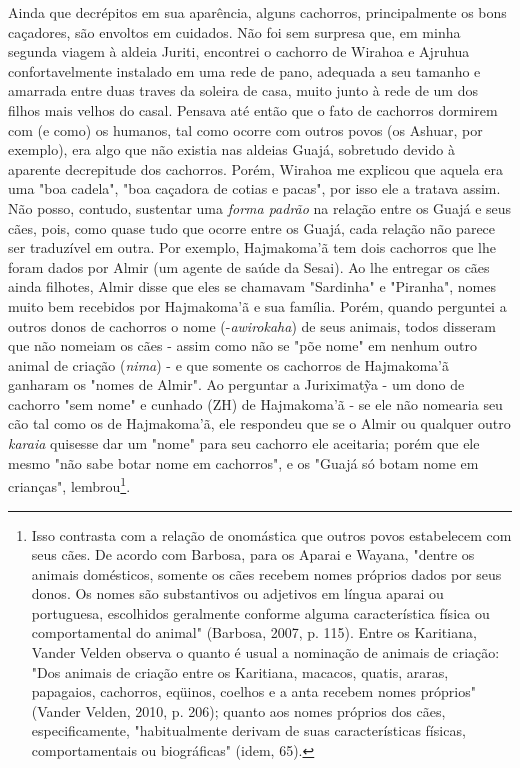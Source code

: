 Ainda que decrépitos em sua aparência, alguns cachorros, principalmente
os bons caçadores, são envoltos em cuidados. Não foi sem surpresa que,
em minha segunda viagem à aldeia Juriti, encontrei o cachorro de Wirahoa
e Ajruhua confortavelmente instalado em uma rede de pano, adequada a seu
tamanho e amarrada entre duas traves da soleira de casa, muito junto à
rede de um dos filhos mais velhos do casal. Pensava até então que o fato
de cachorros dormirem com (e como) os humanos, tal como ocorre com
outros povos (os Ashuar, por exemplo), era algo que não existia nas
aldeias Guajá, sobretudo devido à aparente decrepitude dos cachorros.
Porém, Wirahoa me explicou que aquela era uma "boa cadela", "boa
caçadora de cotias e pacas", por isso ele a tratava assim. Não posso,
contudo, sustentar uma \emph{forma padrão} na relação entre os Guajá e
seus cães, pois, como quase tudo que ocorre entre os Guajá, cada relação
não parece ser traduzível em outra. Por exemplo, Hajmakoma'ã tem dois
cachorros que lhe foram dados por Almir (um agente de saúde da Sesai).
Ao lhe entregar os cães ainda filhotes, Almir disse que eles se chamavam
"Sardinha" e "Piranha", nomes muito bem recebidos por Hajmakoma'ã e sua
família. Porém, quando perguntei a outros donos de cachorros o nome
(-\emph{awirokaha}) de seus animais, todos disseram que não nomeiam os
cães - assim como não se "põe nome" em nenhum outro animal de criação
(\emph{nima}) - e que somente os cachorros de Hajmakoma'ã ganharam os
"nomes de Almir". Ao perguntar a Juriximatỹa - um dono de cachorro "sem
nome" e cunhado (ZH) de Hajmakoma'ã - se ele não nomearia seu cão tal
como os de Hajmakoma'ã, ele respondeu que se o Almir ou qualquer outro
\emph{karaia} quisesse dar um "nome" para seu cachorro ele aceitaria;
porém que ele mesmo "não sabe botar nome em cachorros", e os "Guajá só
botam nome em crianças", lembrou\footnote{Isso contrasta com a relação
  de onomástica que outros povos estabelecem com seus cães. De acordo
  com Barbosa, para os Aparai e Wayana, "dentre os animais domésticos,
  somente os cães recebem nomes próprios dados por seus donos. Os nomes
  são substantivos ou adjetivos em língua aparai ou portuguesa,
  escolhidos geralmente conforme alguma característica física ou
  comportamental do animal" (Barbosa, 2007, p. 115). Entre os Karitiana,
  Vander Velden observa o quanto é usual a nominação de animais de
  criação: "Dos animais de criação entre os Karitiana, macacos, quatis,
  araras, papagaios, cachorros, eqüinos, coelhos e a anta recebem nomes
  próprios" (Vander Velden, 2010, p. 206); quanto aos nomes próprios dos
  cães, especificamente, "habitualmente derivam de suas características
  físicas, comportamentais ou biográficas" (idem, 65).}.

